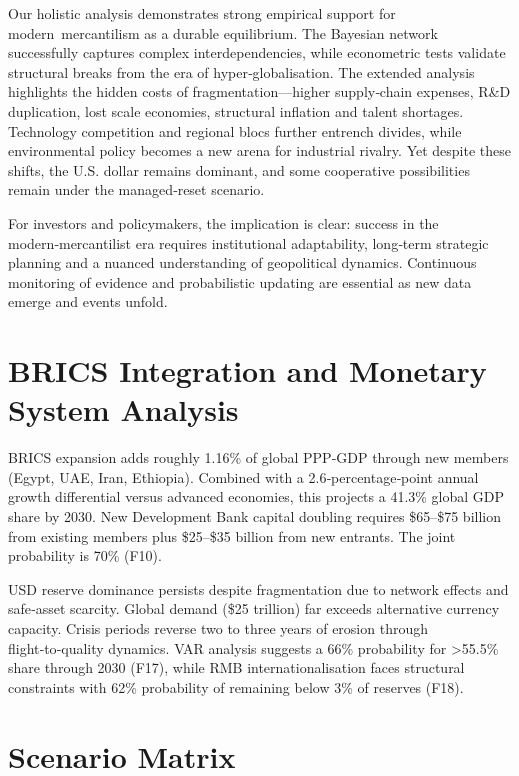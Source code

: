 \documentclass[12pt]{article}
\begin{document}
Our holistic analysis demonstrates strong empirical support for modern mercantilism as a durable equilibrium.  The Bayesian network successfully captures complex interdependencies, while econometric tests validate structural breaks from the era of hyper‑globalisation.  The extended analysis highlights the hidden costs of fragmentation—higher supply‑chain expenses, R\&D duplication, lost scale economies, structural inflation and talent shortages.  Technology competition and regional blocs further entrench divides, while environmental policy becomes a new arena for industrial rivalry.  Yet despite these shifts, the U.S. dollar remains dominant, and some cooperative possibilities remain under the managed‑reset scenario.

For investors and policymakers, the implication is clear: success in the modern‑mercantilist era requires institutional adaptability, long‑term strategic planning and a nuanced understanding of geopolitical dynamics.  Continuous monitoring of evidence and probabilistic updating are essential as new data emerge and events unfold.

\section{BRICS Integration and Monetary System Analysis}

BRICS expansion adds roughly 1.16\% of global PPP‑GDP through new members (Egypt, UAE, Iran, Ethiopia).  Combined with a 2.6‑percentage‑point annual growth differential versus advanced economies, this projects a 41.3\% global GDP share by 2030.  New Development Bank capital doubling requires \$65–\$75 billion from existing members plus \$25–\$35 billion from new entrants.  The joint probability is 70\% (F10).

USD reserve dominance persists despite fragmentation due to network effects and safe‑asset scarcity.  Global demand (\$25 trillion) far exceeds alternative currency capacity.  Crisis periods reverse two to three years of erosion through flight‑to‑quality dynamics.  VAR analysis suggests a 66\% probability for >55.5\% share through 2030 (F17), while RMB internationalisation faces structural constraints with 62\% probability of remaining below 3\% of reserves (F18).

\section{Scenario Matrix}
\end{document}
